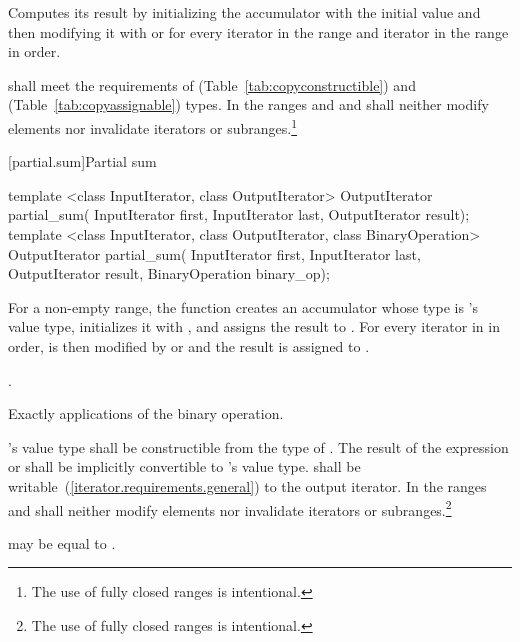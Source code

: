 \begin{itemdescr}
\pnum
\effects
Computes its result by initializing the accumulator
with the initial value
and then modifying it with
or
for every iterator
in the range 
and iterator
in the range
in order.

\pnum
\requires
{} shall meet the requirements of  (Table~\ref{tab:copyconstructible})
and  (Table~\ref{tab:copyassignable}) types.
In the ranges
and
and
shall neither modify elements nor invalidate iterators or subranges.\footnote{The use of fully closed ranges is intentional.}
\end{itemdescr}

[partial.sum]{Partial sum}

%
\begin{itemdecl}
template <class InputIterator, class OutputIterator>
  OutputIterator partial_sum(
    InputIterator first, InputIterator last,
    OutputIterator result);
template <class InputIterator, class OutputIterator, class BinaryOperation>
  OutputIterator partial_sum(
    InputIterator first, InputIterator last,
    OutputIterator result, BinaryOperation binary_op);
\end{itemdecl}

\begin{itemdescr}
\pnum
\effects For a non-empty range,
the function creates an accumulator  whose type is 's
value type, initializes it with ,
and assigns the result to . For every iterator  in 
in order,  is then modified by  or 
and the result is assigned to .

\pnum
\returns
{}.

\pnum
\complexity
Exactly
applications of
the binary operation.

\pnum
\requires
{}'s value type shall be constructible from the type of .
The result of the expression  or  shall be
implicitly convertible to 's value type. 
shall be writable~(\ref{iterator.requirements.general}) to the  output iterator.
In the ranges
and
\mbox{}
shall neither modify elements nor invalidate iterators or subranges.\footnote{The use of fully closed ranges is intentional.
}

\pnum
\remarks
{}
may be equal to
.
\end{itemdescr}


